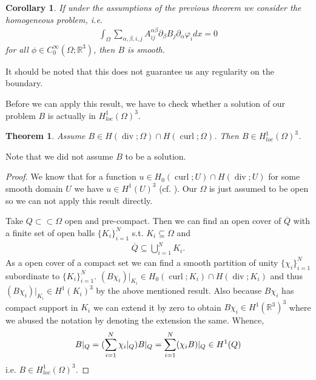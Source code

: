 \documentclass[12pt,a4paper]{article}
\numberwithin{equation}{subsection}
\numberwithin{lemma}{subsection}
\newtheorem{corollary}[lemma]{Corollary}
\newtheorem{theorem}[lemma]{Theorem}
\theoremstyle{definition}
\DeclareMathOperator{\curl}{curl}
\DeclareMathOperator{\diver}{div}
\newcommand{\real}{\mathbb{R}}
\begin{document}
\begin{corollary}\label{cor:smooth_solution}
    If under the assumptions of the previous theorem we consider the 
    homogeneous problem, i.e.
    \begin{align*}
        \int_\Omega \sum\limits_{\alpha,\beta,i,j} 
        A_{ij}^{\alpha \beta} \partial_\beta B_j \partial_\alpha \varphi_i dx =0
    \end{align*}
    for all $\phi \in C^\infty_0(\Omega;\real^3)$, then $B$ is smooth.   
\end{corollary}
It should be noted that this does not guarantee us any regularity on the 
boundary. 

Before we can apply this result, we have to check whether a solution of our 
problem $B$ is actually in $H^1_{loc}(\Omega)^3$. 

\begin{theorem}\label{thm:solution_in_H1loc}
    Assume $B \in H(\diver;\Omega) \cap H(\curl;\Omega)$. Then 
    $B \in H^1_{loc}(\Omega)^3$.
\end{theorem}
Note that we did not assume $B$ to be a solution.
\begin{proof}
    We know that for a function $u \in H_0(\curl;U) \cap H(\diver;U)$ 
    for some smooth domain $U$ we have $u \in H^1(U)^3$ 
    (cf. \cite[Remark 3.48]{monk}). Our $\Omega$ is just assumed to be open 
    so we can not apply this result directly.

    Take $Q \subset\subset \Omega$ open and pre-compact. 
    Then we can find an open 
    cover of $\overline{Q}$ with a finite set of open balls $\{K_i\}_{i=1}^N$
    s.t. $K_i \subseteq \Omega$ and 
    \begin{align*}
        \overline{Q} \subseteq \bigcup\limits_{i=1}^N K_i.
    \end{align*}
    As a open cover of a compact set we can find a smooth partition of unity 
    $\{\chi_i\}_{i=1}^N$ subordinate to $\{K_i\}_{i=1}^N$. 
    $(B \chi_i)|_{K_i} \in H_0(\curl;K_i) \cap H(\diver;K_i)$ and thus 
    $(B \chi_i)|_{K_i} \in H^1(K_i)^3$ by the above mentioned result. 
    Also because $B \chi_i$ has compact support in $K_i$ we can extend it by 
    zero to obtain
    $B \chi_i \in H^1(\real^3)^3$ where we abused the notation by denoting 
    the extension the same. Whence,
    \begin{align*}
        B|_Q = \large( \sum\limits_{i=1}^N \chi_i |_Q \large) B|_Q = 
        \sum\limits_{i=1}^N (\chi_i B)|_Q \in H^1(Q)
    \end{align*}
    i.e. $B \in H^1_{loc}(\Omega)^3$.
\end{proof}
\end{document}
